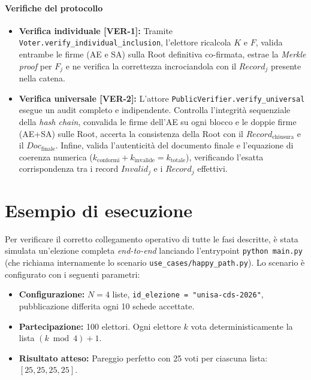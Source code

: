 \paragraph{Verifiche del protocollo}
\begin{itemize}
  \item \textbf{Verifica individuale [VER-1]:} Tramite \texttt{Voter.verify\_individual\_inclusion}, l'elettore ricalcola $K$ e $F$, valida entrambe le firme (AE e SA) sulla Root definitiva co-firmata, estrae la \emph{Merkle proof} per $F_j$ e ne verifica la correttezza incrociandola con il $\mathit{Record}_j$ presente nella catena.
  
  \item \textbf{Verifica universale [VER-2]:} L'attore \texttt{PublicVerifier.verify\_universal} esegue un audit completo e indipendente. Controlla l'integrità sequenziale della \emph{hash chain}, convalida le firme dell'AE su ogni blocco e le doppie firme (AE+SA) sulle Root, accerta la consistenza della Root con il $\mathit{Record}_{\text{chiusura}}$ e il $\mathit{Doc}_{\text{finale}}$. Infine, valida l'autenticità del documento finale e l'equazione di coerenza numerica ($k_{\text{conformi}} + k_{\text{invalide}} = k_{\text{totale}}$), verificando l'esatta corrispondenza tra i record $\mathit{Invalid}_j$ e i $\mathit{Record}_j$ effettivi.
\end{itemize}


\section{Esempio di esecuzione}
\label{sec:wp4_esempio}

Per verificare il corretto collegamento operativo di tutte le fasi descritte, è stata simulata un'elezione completa \emph{end-to-end} lanciando l'entrypoint \texttt{python main.py} (che richiama internamente lo scenario \texttt{use\_cases/happy\_path.py}). Lo scenario è configurato con i seguenti parametri:
\begin{itemize}
  \item \textbf{Configurazione:} $N = 4$ liste, \texttt{id\_elezione = "unisa-cds-2026"}, pubblicazione differita ogni 10 schede accettate.
  \item \textbf{Partecipazione:} 100 elettori. Ogni elettore $k$ vota deterministicamente la lista $(k \bmod 4) + 1$.
  \item \textbf{Risultato atteso:} Pareggio perfetto con 25 voti per ciascuna lista: $[25, 25, 25, 25]$.
\end{itemize}

